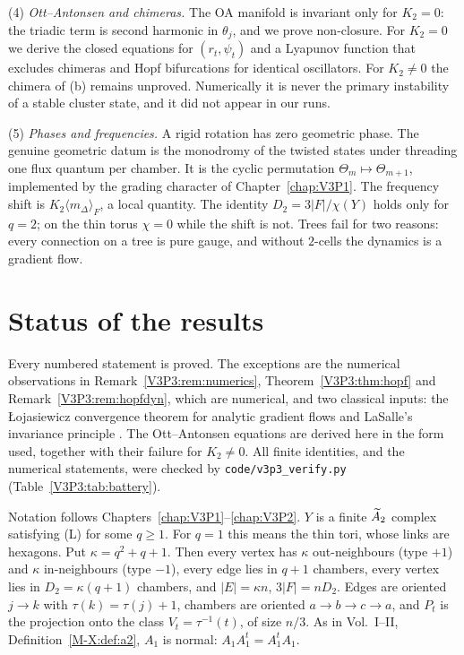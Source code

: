 \begin{chapterabstract}
(4) \emph{Ott--Antonsen and chimeras.} The OA manifold is invariant only for $K_2=0$: the
triadic term is second harmonic in $\theta_j$, and we prove non-closure. For $K_2=0$ we derive
the closed equations for $(r_t,\psi_t)$ and a Lyapunov function that excludes chimeras and
Hopf bifurcations for identical oscillators. For $K_2\ne0$ the chimera of (b) remains
unproved. Numerically it is never the primary instability of a stable cluster state, and it
did not appear in our runs.

(5) \emph{Phases and frequencies.} A rigid rotation has zero geometric phase. The genuine
geometric datum is the monodromy of the twisted states under threading one flux quantum per
chamber. It is the cyclic permutation $\Theta_m\mapsto\Theta_{m+1}$, implemented by the
grading character of Chapter~\ref{chap:V3P1}. The frequency shift is $K_2\langle m_\Delta\rangle_F$, a local
quantity. The identity $D_2=3|F|/\chi(Y)$ holds only for $q=2$; on the thin torus $\chi=0$
while the shift is not. Trees fail for two reasons: every connection on a tree is pure gauge,
and without $2$-cells the dynamics is a gradient flow.
\end{chapterabstract}

\section*{Status of the results}

Every numbered statement is proved. The exceptions are the numerical observations in
Remark~\ref{V3P3:rem:numerics}, Theorem~\ref{V3P3:thm:hopf} and Remark~\ref{V3P3:rem:hopfdyn}, which
are numerical, and two classical inputs: the \L{}ojasiewicz convergence
theorem for analytic gradient flows \cite{Loj63} and LaSalle's invariance principle
\cite{LaSalle60}. The Ott--Antonsen equations are derived here in the form used, together with
their failure for $K_2\ne0$. All finite identities, and the numerical statements, were checked
by \texttt{code/v3p3\_verify.py} (Table~\ref{V3P3:tab:battery}).

Notation follows Chapters~\ref{chap:V3P1}--\ref{chap:V3P2}. $Y$ is a finite $\widetilde A_2$ complex satisfying (L) for some
$q\ge1$. For $q=1$ this means the thin tori, whose links are hexagons. Put
$\kappa=q^{2}+q+1$. Then every vertex has $\kappa$ out-neighbours (type $+1$) and $\kappa$
in-neighbours (type $-1$), every edge lies in $q+1$ chambers, every vertex lies in
$D_2=\kappa(q+1)$ chambers, and $|E|=\kappa n$, $3|F|=nD_2$. Edges are oriented
$j\to k$ with $\tau(k)=\tau(j)+1$, chambers are oriented $a\to b\to c\to a$, and
$P_t$ is the projection onto the class $V_t=\tau^{-1}(t)$, of size $n/3$. As in Vol.~I--II,
Definition~\ref{M-X:def:a2}, $A_1$ is normal: $A_1A_1^{t}=A_1^{t}A_1$.

